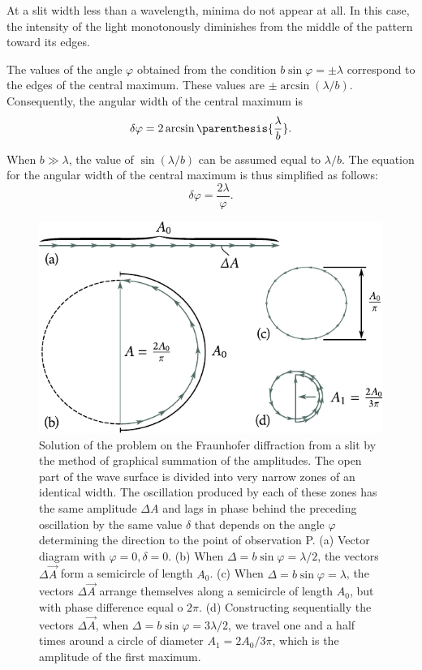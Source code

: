 \noindent
At a slit width less than a wavelength, minima do not appear at all.
In this case, the intensity of the light monotonously diminishes from the middle of the pattern toward its edges.

The values of the angle $\varphi$ obtained from the condition $b\sin\varphi=\pm\lambda$ correspond to the edges of the central maximum.
These values are $\pm\arcsin(\lambda/b)$.
Consequently, the angular width of the central maximum is
\begin{equation}\label{eq:18_28}
	\delta\varphi = 2 \arcsin\parenthesis{\frac{\lambda}{b}}.
\end{equation}

\noindent
When $b\gg\lambda$, the value of $\sin(\lambda/b)$ can be assumed equal to $\lambda/b$.
The equation for the angular width of the central maximum is thus simplified as follows:
\begin{equation}\label{eq:18_29}
	\delta\varphi = \frac{2 \lambda}{\varphi}.
\end{equation}

\begin{figure}[t]
	\begin{center}
		\includegraphics[scale=1]{figures/ch_18/fig_18_29.pdf}
        \caption[]{Solution of the problem on the Fraunhofer diffraction from a slit by the method of graphical summation of the amplitudes. The open part of the wave surface is divided into very narrow zones of an identical width. The oscillation produced by each of these zones has the same amplitude $\Delta{A}$ and lags in phase behind the preceding oscillation by the same value $\delta$ that depends on the angle $\varphi$ determining the direction to the point of observation P. (a) Vector diagram with $\varphi=0, \delta=0$. (b) When $\Delta=b\sin\varphi= \lambda/2$, the vectors $\Delta{\vec{A}}$ form a semicircle of length $A_0$. (c) When $\Delta=b\sin\varphi=\lambda$, the vectors $\Delta{\vec{A}}$ arrange themselves along a semicircle of length $A_0$, but with phase difference equal o $2\pi$. (d) Constructing sequentially the vectors $\Delta{\vec{A}}$,  when $\Delta=b\sin\varphi=3\lambda/2$, we travel one and a half times around a circle of diameter $A_1=2A_0/3\pi$, which is the amplitude of the first maximum.}
		\label{fig:18_29}
	\end{center}
	\vspace{-0.8cm}
\end{figure}

